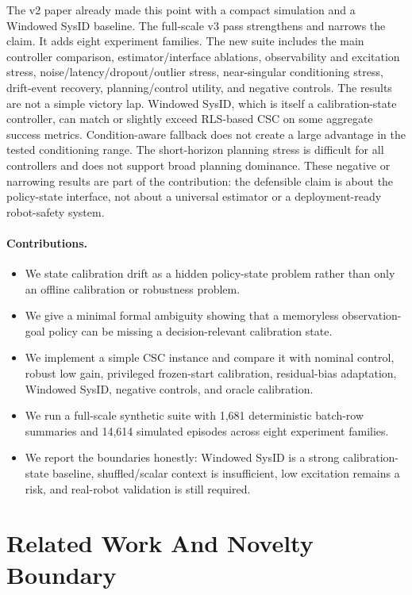 \documentclass{article}
\begin{document}
The v2 paper already made this point with a compact simulation and a Windowed
SysID baseline. The full-scale v3 pass strengthens and narrows the claim. It
adds eight experiment families. The new suite includes the main controller
comparison, estimator/interface ablations, observability and excitation stress,
noise/latency/dropout/outlier stress, near-singular conditioning stress,
drift-event recovery, planning/control utility, and negative controls. The
results are not a simple victory lap. Windowed SysID, which is itself a
calibration-state controller, can match or slightly exceed RLS-based CSC on
some aggregate success metrics. Condition-aware fallback does not create a
large advantage in the tested conditioning range. The short-horizon planning
stress is difficult for all controllers and does not support broad planning
dominance. These negative or narrowing results are part of the contribution:
the defensible claim is about the policy-state interface, not about a
universal estimator or a deployment-ready robot-safety system.

\paragraph{Contributions.}
\begin{itemize}[leftmargin=*]
\item We state calibration drift as a hidden policy-state problem rather than
only an offline calibration or robustness problem.
\item We give a minimal formal ambiguity showing that a memoryless
observation-goal policy can be missing a decision-relevant calibration state.
\item We implement a simple CSC instance and compare it with nominal control,
robust low gain, privileged frozen-start calibration, residual-bias adaptation,
Windowed SysID, negative controls, and oracle calibration.
\item We run a full-scale synthetic suite with 1,681 deterministic batch-row
summaries and 14,614 simulated episodes across eight experiment families.
\item We report the boundaries honestly: Windowed SysID is a strong
calibration-state baseline, shuffled/scalar context is insufficient, low
excitation remains a risk, and real-robot validation is still required.
\end{itemize}

\section{Related Work And Novelty Boundary}
\end{document}
